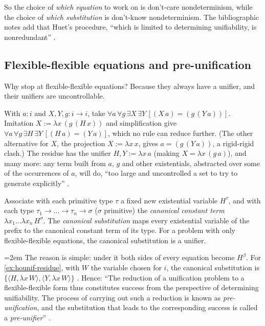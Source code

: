 So the choice of \emph{which equation} to work on is don't-care nondeterminism, while the choice of \emph{which
substitution} is don't-know nondeterminism. The bibliographic notes add that Huet's procedure, \enquote{which is
limited to determining unifiability, is nonredundant} .

\subsection{Flexible-flexible equations and pre-unification}

Why stop at flexible-flexible equations? Because they always have a unifier, and their unifiers are
uncontrollable.

\begin{example}\label{ex:hounif-residue}
With $a:i$ and $X,Y,g:i\to i$, take $\forall a\,\forall g\,\exists X\,\exists Y\,[(X\,a)=(g\,(Y\,a))]$. Imitation
$X:=\lambda x\,(g\,(H\,x))$ and simplification give $\forall a\,\forall g\,\exists H\,\exists Y\,[(H\,a)=(Y\,a)]$, which no
rule can reduce further. (The other alternative for $X$, the projection $X:=\lambda x\,x$, gives $a=(g\,(Y\,a))$,
a rigid-rigid clash.) The residue has the unifier $H,Y:=\lambda x\,a$ (making $X=\lambda x\,(g\,a)$), and many more: any
term built from $a$, $g$ and other existentials, abstracted over some of the occurrences of $a$, will do,
\enquote{too large and uncontrolled a set to try to generate explicitly} .
\end{example}

\begin{proposition}\label{prop:hounif-canonical}
Associate with each primitive type $\tau$ a fixed new existential variable $H^\tau$, and with each type
$\tau_1\to\dots\to\tau_n\to\sigma$ ($\sigma$ primitive) the \emph{canonical constant term}
$\lambda x_1\dots\lambda x_n\,H^\sigma$. The \emph{canonical substitution} maps every existential variable of the
prefix to the canonical constant term of its type. For a problem with only flexible-flexible equations, the
canonical substitution is a unifier.
\end{proposition}

{\emergencystretch=2em
The reason is simple: under it both sides of every equation become $H^\beta$. For \cref{ex:hounif-residue}, with
$W$ the variable chosen for $i$, the canonical substitution is $\{\langle H,\lambda x\,W\rangle,\allowbreak\langle Y,\lambda x\,W\rangle\}$
. Hence: \enquote{The reduction of a unification problem to a flexible-flexible form thus constitutes
success from the perspective of determining unifiability. The process of carrying out such a reduction is known
as \emph{pre-unification}, and the substitution that leads to the corresponding success is called a
\emph{pre-unifier}} .\par}

